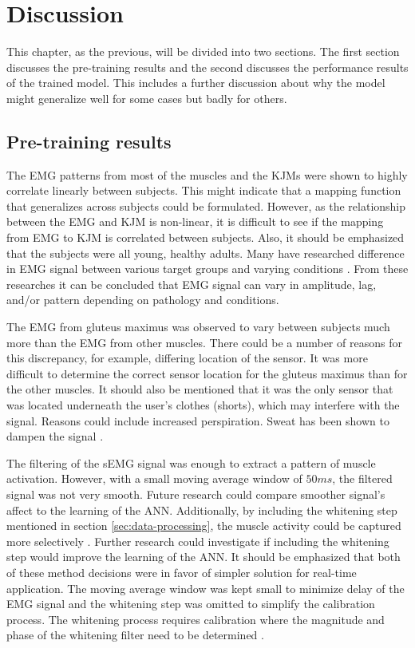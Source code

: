 \documentclass[../main.tex]{subfiles}
\begin{document}
\chapter{Discussion}
\label{sec:discussion}
This chapter, as the previous, will be divided into two sections. 
The first section discusses the pre-training results and the second discusses the performance results of the trained model.
This includes a further discussion about why the model might generalize well for some cases but badly for others.

\section{Pre-training results}
\label{sec:discussion_pre-training-results}
The \ac{EMG} patterns from most of the muscles and the \acp{KJM} were shown to highly correlate linearly between subjects.
This might indicate that a mapping function that generalizes across subjects could be formulated.
However, as the relationship between the \ac{EMG} and \ac{KJM} is non-linear, it is difficult to see if the mapping from \ac{EMG} to \ac{KJM} is correlated between subjects.
Also, it should be emphasized that the subjects were all young, healthy adults.
Many have researched difference in \ac{EMG} signal between various target groups and varying conditions \cite{Courtine2003,Rezgui2013,Sacco2010, Zwaan2012}.
From these researches it can be concluded that \ac{EMG} signal can vary in amplitude, lag, and/or pattern depending on pathology and conditions.

The \ac{EMG} from gluteus maximus was observed to vary between subjects much more than the \ac{EMG} from other muscles.
There could be a number of reasons for this discrepancy, for example, differing location of the sensor.
It was more difficult to determine the correct sensor location for the gluteus maximus than for the other muscles.
It should also be mentioned that it was the only sensor that was located underneath the user's clothes (shorts), which may interfere with the signal.
Reasons could include increased perspiration. 
Sweat has been shown to dampen the signal \cite{Abdoli-Eramaki2012}.

The filtering of the \ac{sEMG} signal was enough to extract a pattern of muscle activation.
However, with a small moving average window of $50ms$, the filtered signal was not very smooth.
Future research could compare smoother signal's affect to the learning of the \ac{ANN}.
Additionally, by including the whitening step mentioned in section \ref{sec:data-processing}, the muscle activity could be captured more selectively \cite{Clancy2016}.
Further research could investigate if including the whitening step would improve the learning of the \ac{ANN}.
It should be emphasized that both of these method decisions were in favor of simpler solution for real-time application.
The moving average window was kept small to minimize delay of the \ac{EMG} signal and the whitening step was omitted to simplify the calibration process.
The whitening process requires calibration where the magnitude and phase of the whitening filter need to be determined \cite{Clancy2016}.
\end{document}

